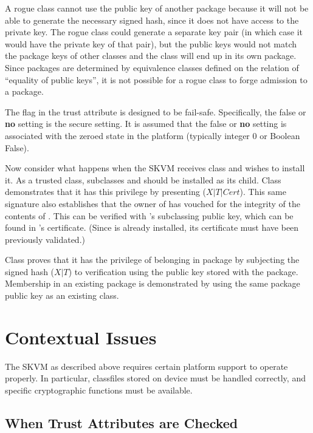 \documentclass{llncs}
\begin{document}
A rogue class cannot use the public key of another package because it
will not be able to generate the necessary signed hash, since it does
not have access to the private key. The rogue class could generate a
separate key pair (in which case it would have the private key of that
pair), but the public keys would not match the package keys of other
classes and the class will end up in its own package. Since packages are
determined by equivalence classes defined on the relation of ``equality
of public keys'', it is not possible for a rogue class to forge admission
to a package.

The  flag in the trust attribute is designed to be fail-safe.
Specifically, the false or {\bf no} setting is the secure setting. It is
assumed that the false or {\bf no} setting is associated with the zeroed state
in the platform (typically integer 0 or Boolean False).

Now consider what happens when the SKVM receives class  and wishes to
install it. As a trusted class,  subclasses  and should be installed
as its child. Class  demonstrates that it has this privilege by
presenting ($X|T|Cert$). This same signature also establishes that the
owner of  has vouched for the integrity of the contents of . This can
be verified with 's subclassing public key, which can be found in 's
certificate. (Since  is already installed, its certificate must have
been previously validated.)

Class  proves that it has the privilege of belonging in package  by
subjecting the signed hash ($X|T$) to verification using the public key
stored with the package. Membership in an existing package is
demonstrated by using the same package public key as an existing class.

\section{Contextual Issues}

The SKVM as described above requires certain platform support to operate
properly. In particular, classfiles stored on device must be handled
correctly, and specific cryptographic functions must be available.


\subsection{When Trust Attributes are Checked}
\end{document}
